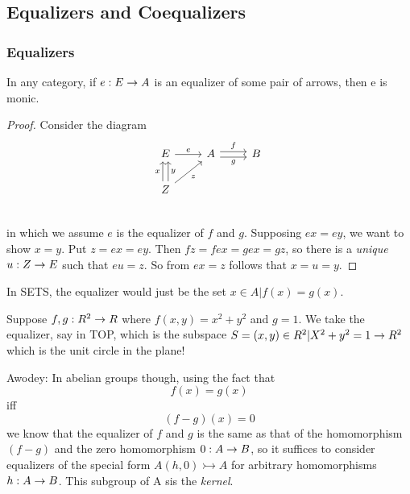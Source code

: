 \documentclass[../../notes.tex]{subfiles}
\begin{document}
\subsection{Equalizers and Coequalizers}
\subsubsection{Equalizers}
\begin{proposition}

  In any category, if $e : E \rightarrow A$ is an equalizer of some pair of arrows, then e is monic.

\end{proposition}

\begin{proof}

  Consider the diagram
  \[
    \begin{tikzcd}
      E \arrow[r, "e"] &
      A \arrow[r, shift left, "f"] \arrow[r, shift right, swap, "g"] & B \\
      Z \arrow[u, shift left, "x"] \arrow[u, shift right, swap, "y"]
      \arrow[ur, swap, "z"]& & \\
    \end{tikzcd}
  \]
  in which we assume $e$ is the equalizer of $f$ and $g$. Supposing $ex = ey$, we want to show $ x = y $. Put $z = ex = ey$. Then $fz = fex = gex = gz$, so there is a \textit{unique} $u : Z \rightarrow E$ such that $eu = z$. So from $ex = z$ follows that $x = u = y$.
  
\end{proof}

In SETS, the equalizer would just be the set $ { x \in A | f(x) = g(x) } $.


Suppose $ f, g : R^2 \rightarrow R $ where $ f (x, y) = x^2 + y^2 $
and $ g = 1 $. We take the equalizer, say in TOP, which is the subspace
$ S = { (x, y) \in R^2 | X^2 + y^2 = 1} \rightarrow R^2 $ %
which is the unit circle in the plane!


Awodey: In abelian groups though, using the fact that $$ f(x) = g(x)$$ iff $$(f-g)(x) = 0 $$ we know that the equalizer of $f$ and $g$ is the same as that of the homomorphism $(f-g)$ and the zero homomorphism $ 0 : A \rightarrow B $, so it suffices to consider equalizers of the special form $ A(h, 0) \rightarrowtail A $ for arbitrary homomorphisms $ h: A \rightarrow B $. This subgroup of A sis the \textit{kernel}.
\end{document}
